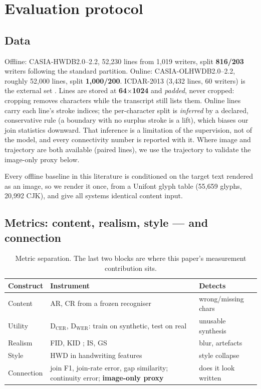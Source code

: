 \documentclass[conference]{IEEEtran}
\begin{document}
\section{Evaluation protocol}
\label{sec:protocol}

\subsection{Data}
Offline: CASIA-HWDB2.0--2.2, 52{,}230 lines from 1{,}019 writers, split \textbf{816/203}
writers following the standard partition. Online: CASIA-OLHWDB2.0--2.2, roughly 52{,}000
lines, split \textbf{1{,}000/200}. ICDAR-2013 (3{,}432 lines, 60 writers) is the external set
\cite{casia,icdar2013zh}. Lines are stored at \textbf{64$\times$1024} and \emph{padded}, never
cropped: cropping removes characters while the transcript still lists them. Online lines carry
each line's stroke indices; the per-character split is \emph{inferred} by a declared,
conservative rule (a boundary with no surplus stroke is a lift), which biases our join
statistics downward. That inference is a limitation of the supervision, not of the model, and
every connectivity number is reported with it. Where image and trajectory are both available
(paired lines), we use the trajectory to validate the image-only proxy below.

Every offline baseline in this literature is conditioned on the target text rendered as an
image, so we render it once, from a Unifont glyph table (55{,}659 glyphs, 20{,}992 CJK), and
give all systems identical content input.

\subsection{Metrics: content, realism, style --- and connection}
\begin{table}[t]
\centering
\caption{Metric separation. The last two blocks are where this paper's measurement
contribution sits.}
\label{tab:metrics}
\small
\begin{tabular}{@{}p{1.7cm}p{2.6cm}p{1.6cm}@{}}
\toprule
Construct & Instrument & Detects \\
\midrule
Content & AR, CR from a frozen recogniser \cite{chen2023} & wrong/missing chars \\
Utility & D$_{\text{CER}}$, D$_{\text{WER}}$: train on synthetic, test on real & unusable synthesis \\
Realism & FID, KID \cite{fid,inception,kid}; IS, GS \cite{inception_score,gs} & blur, artefacts \\
Style & HWD \cite{hwd} in handwriting features & style collapse \\
\midrule
Connection & join F1, join-rate error, gap similarity; continuity error; \textbf{image-only proxy} & does it look written \\
\bottomrule
\end{tabular}
\end{table}
\end{document}
